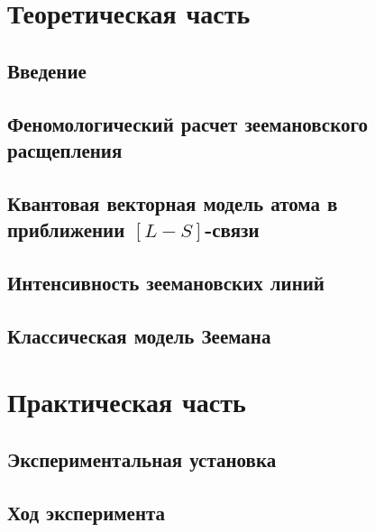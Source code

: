 



\def\labauthors{Сарафанов Ф.Г., Понур К.А., Карусевич А.А., Шиков А.П., Есюнин Д.,Есюнин М., Сидоров Д.А.}
\def\labgroup{430}
\def\labnumber{2}
\def\labtheme{Эффект Зеемана}
\renewcommand{\vec}{\mathbf}
\renewcommand{\Re}{\operatorname{Re}}
\renewcommand{\Im}{\operatorname{Im}}
\renewcommand{\phi}{\varphi}
\renewcommand{\hat}{\widehat}



\tableofcontents
\newpage
\section{Теоретическая часть}
\subsection{Введение}

\subsection{Феномологический расчет зеемановского расщепления}

\subsection{Квантовая векторная модель атома в приближении $[L-S]$-связи}

\subsection{Интенсивность зеемановских линий}

\subsection{Классическая модель Зеемана}

\section{Практическая часть}
\subsection{Экспериментальная установка}

\subsection{Ход эксперимента}


